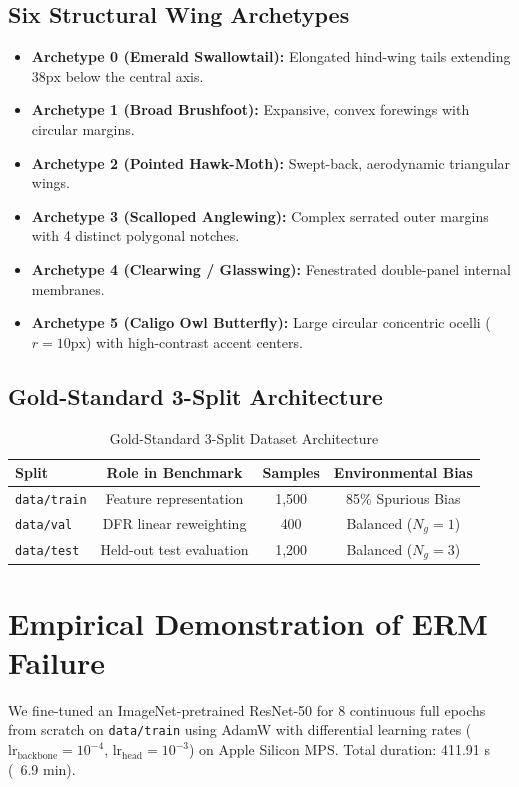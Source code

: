 \documentclass[10pt,journal,compsoc]{IEEEtran}
\begin{document}
\subsection{Six Structural Wing Archetypes}
\begin{itemize}
\item \textbf{Archetype 0 (Emerald Swallowtail):} Elongated hind-wing tails extending $38\text{px}$ below the central axis.
\item \textbf{Archetype 1 (Broad Brushfoot):} Expansive, convex forewings with circular margins.
\item \textbf{Archetype 2 (Pointed Hawk-Moth):} Swept-back, aerodynamic triangular wings.
\item \textbf{Archetype 3 (Scalloped Anglewing):} Complex serrated outer margins with 4 distinct polygonal notches.
\item \textbf{Archetype 4 (Clearwing / Glasswing):} Fenestrated double-panel internal membranes.
\item \textbf{Archetype 5 (Caligo Owl Butterfly):} Large circular concentric ocelli ($r = 10\text{px}$) with high-contrast accent centers.
\end{itemize}

\subsection{Gold-Standard 3-Split Architecture}
\begin{table}[h]
\centering
\caption{Gold-Standard 3-Split Dataset Architecture}
\label{tab:3split}
\begin{tabular}{lccc}
\toprule
Split & Role in Benchmark & Samples & Environmental Bias \\
\midrule
\texttt{data/train} & Feature representation & 1,500 & 85\% Spurious Bias \\
\texttt{data/val} & DFR linear reweighting & 400 & Balanced ($N_g = 1$) \\
\texttt{data/test} & Held-out test evaluation & 1,200 & Balanced ($N_g = 3$) \\
\bottomrule
\end{tabular}
\end{table}

\section{Empirical Demonstration of ERM Failure}

We fine-tuned an ImageNet-pretrained ResNet-50 \cite{he2016resnet} for 8 continuous full epochs from scratch on \texttt{data/train} using AdamW \cite{loshchilov2019adamw} with differential learning rates ($\text{lr}_{\text{backbone}} = 10^{-4}$, $\text{lr}_{\text{head}} = 10^{-3}$) on Apple Silicon MPS. Total duration: 411.91 s (~6.9 min).
\end{document}
